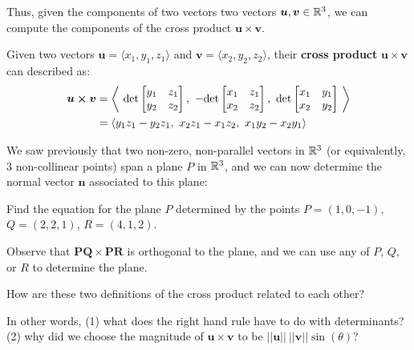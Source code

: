 Thus, given the components of two vectors two vectors $\bm{u}, \bm{v} \in \mathbb{R}^3$, we can compute the components of the cross product $\bm{u \times v}$.

\begin{theorem}\label{crossprodcomponents}
    
    Given two vectors $\bm{u} = \langle x_1, y_1, z_1 \rangle$ and $\bm{v}= \langle x_2, y_2, z_2 \rangle$, their \textbf{cross product} $\bm{u \times v}$ can described as:
    \begin{align*} \bm{u \times v} &= 
\left\langle \  \textnormal{det}\begin{bmatrix}
y_1 & z_1 \\
y_2 & z_2
\end{bmatrix}, \  - \textnormal{det}\begin{bmatrix}
x_1 & z_1 \\
x_2 & z_2
\end{bmatrix}, \ \textnormal{det}\begin{bmatrix}
x_1 & y_1  \\
x_2 & y_2  \\
\end{bmatrix} \ \right\rangle \\
&= 
\langle y_1z_1 - y_2z_1, \ x_2z_1 - x_1z_2, \ x_1y_2-x_2y_1  \rangle \\
\end{align*}
    
\end{theorem}


We saw previously that two non-zero, non-parallel vectors in $\mathbb{R}^3$ (or equivalently, 3 non-collinear points) span a plane $P$ in $\mathbb{R}^3$, and we can now determine the normal vector $\bm{n}$ associated to this plane:

\begin{example}
    Find the equation for the plane $P$ determined by the points $P = (1,0,-1)$, $Q = (2,2,1)$, $R = (4,1,2)$.
    
    Observe that $\bm{PQ} \times \bm{PR}$ is orthogonal to the plane, and we can use any of $P$, $Q$, or $R$ to determine the plane.
\end{example}



\begin{motivating}
How are these two definitions of the cross product related to each other?
\end{motivating}

In other words, (1) what does the right hand rule have to do with determinants?  (2) why did we choose the magnitude of $\bm{u \times v}$ to be $||\bm{u}|| \ ||\bm{v}|| \sin(\theta)$?

